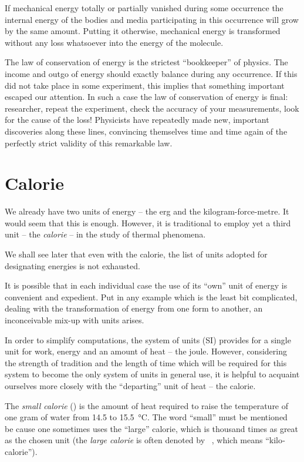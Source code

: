 If mechanical energy totally or partially vanished during some occurrence the internal energy of the bodies and media participating in this occurrence will grow by the same amount. Putting it otherwise, mechanical energy is transformed without any loss whatsoever into the energy of the molecule.

The law of conservation of energy is the strictest ``bookkeeper'' of physics. The income and outgo of energy should exactly balance during any occurrence. If this did not take place in some experiment, this implies that something important escaped our attention. In such a case the law of conservation of energy is final: researcher, repeat the experiment, check the accuracy of your measurements, look for the cause of the loss! Physicists have repeatedly made new, important discoveries along these lines, convincing themselves time and time again of the perfectly strict validity of this remarkable law.


\section{Calorie}

We already have two units of energy -- the erg and the kilogram-force-metre. It would seem that this is enough. However, it is traditional to employ yet a third unit -- the \emph{calorie} -- in the study of thermal phenomena.

We shall see later that even with the calorie, the list of units adopted for designating energies is not exhaust­ed.

It is possible that in each individual case the use of its ``own'' unit of energy is convenient and expedient. Put in any example which is the least bit complicated, dealing with the transformation of energy from one form to another, an inconceivable mix-up with units arises.

In order to simplify computations, the system of units (SI) provides for a single unit for work, energy and an amount of heat -- the joule. However, considering the strength of tradition and the length of time which will be required for this system to become the only system of units in general use, it is helpful to acquaint ourselves more closely with the ``departing'' unit of heat -- the calorie.

The \emph{small calorie} (\si{\calorie}) is the amount of heat required to raise the temperature of one gram of water from 14.5 to \SI{15.5}{\celsius}. The word ``small'' must be mentioned be­ cause one sometimes uses the ``large'' calorie, which is thousand times as great as the chosen unit (the \emph{large calorie} is often denoted by \si{\kilo\calorie}, which means ``kilo­ calorie'').

